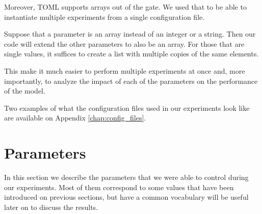 Moreover, TOML supports arrays out of the gate.
We used that to be able to instantiate multiple experiments from a single configuration file.

Suppose that a parameter is an array instead of an integer or a string.
Then our code will extend the other parameters to also be an array.
For those that are single values, it suffices to create a list with multiple copies of the same elements.

This make it much easier to perform multiple experiments at once and, more importantly, to analyze the impact of each of the parameters on the performance of the model.

Two examples of what the configuration files used in our experiments look like are available on Appendix \ref{chap:config_files}.

\section{Parameters}

In this section we describe the parameters that we were able to control during our experiments.
Most of them correspond to some values that have been introduced on previous sections, but have a common vocabulary will be useful later on to discuss the results.

